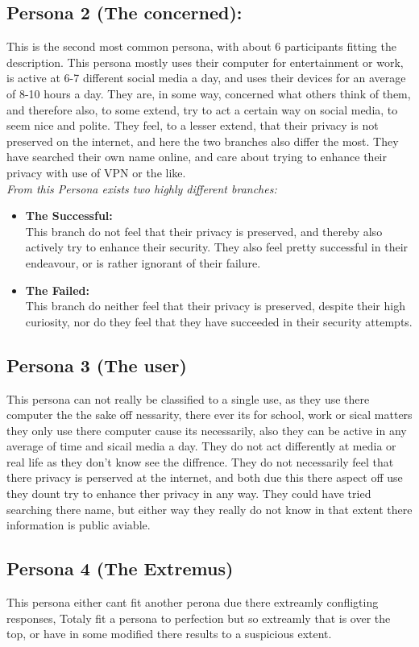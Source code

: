 \subsection{Persona 2 (The concerned):}
This is the second most common persona, with about 6 participants fitting the description.
This persona mostly uses their computer for entertainment or work, is active at 6-7 different social media a day,
and uses their devices for an average of 8-10 hours a day.
They are, in some way, concerned what others think of them, and therefore also, to some extend, try to act a certain way on social media, to seem nice and polite.
They feel, to a lesser extend, that their privacy is not preserved on the internet, and here the two branches also differ the most.
They have searched their own name online, and care about trying to enhance their privacy with use of VPN or the like.\\

\textit{From this Persona exists two highly different branches:}
\begin{itemize}
    \item 
    \textbf{The Successful:}\\
    This branch do not feel that their privacy is preserved, and thereby also actively try to enhance their security. They also feel pretty successful in their endeavour, or is rather ignorant of their failure.
    \item 
    \textbf{The Failed:}\\
    This branch do neither feel that their privacy is preserved, despite their high curiosity, nor do they feel that they have succeeded in their security attempts.
\end{itemize}

\subsection{Persona 3 (The user)}
This persona can not really be classified to a single use, as they use there computer the the sake off nessarity, there ever its for school, work or sical matters they only use there computer cause its necessarily, also they can be active in any average of time and sicail media a day.
They do not act differently at media or real life as they don't know see the diffrence.
They do not necessarily feel that there privacy is perserved at the internet, and both due this there aspect off use they dount try to enhance ther privacy in any way.
They could have tried searching there name, but either way they really do not know in that extent there information is public aviable.

\subsection{Persona 4 (The Extremus)}
This persona either cant fit another perona due there extreamly confligting responses, Totaly fit a persona to perfection but so extreamly that is over the top, or have in some modified there results to a suspicious extent.